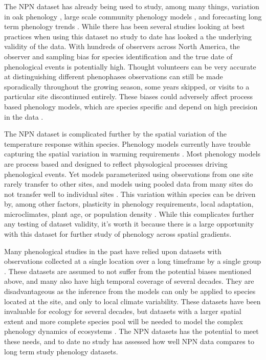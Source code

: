 \documentclass[fleqn,10pt,lineno]{wlpeerj} %
\begin{document}
The NPN dataset has already being used to study, among many things, variation in oak phenology \citep{gerst2017}, large scale community phenology models \citep{melaas2016}, and forecasting long term phenology trends \citep{jeong2013}. While there has been several studies looking at best practices when using this dataset \citep{crimmins2017, gerst2016} no study to date has looked a the underlying validity of the data. With hundreds of observers across North America, the observer and sampling bias for species identification and the true date of phenological events is potentially high. Thought volunteers can be very accurate at distinguishing different phenophases \citep{fuccillo2015} observations can still be made sporadically throughout the growing season, some years skipped, or visits to a particular site discontinued entirely. These biases could adversely affect process based phenology models, which are species specific and depend on high precision in the data \citep{chuine2000}.

The NPN dataset is complicated further by the spatial variation of the temperature response within species. Phenology models currently have trouble capturing the spatial variation in warming requirements \citep{garcia-mozo2008, xu2013, olsson2014, basler2016}. Most phenology models are process based and designed to reflect physological processes driving phenological events. Yet models parameterized using observations from one site rarely  transfer to other sites, and models using pooled data from many sites do not transfer well to individual sites \citep{garcia-mozo2008, basler2016}. This variation within species can be driven by, among other factors, plasticity in phenology requirements, local adaptation, microclimates, plant age, or population density \citep{kramer1995,diez2012}. While this complicates further any testing of dataset validity, it's worth it because there is a large opportunity with this dataset for further study of phenology across spatial gradients. 

Many phenological studies in the past have relied upon datasets with observations collected at a single location over a long timeframe by a single group \citep{cook2012, roberts2015, clark2014}. These datasets are assumed to not suffer from the potential biases mentioned above, and many also have high temporal coverage of several decades. They are disadvantageous as the inference from the models can only be applied to species located at the site, and only to local climate variability. These datasets have been invaluable for ecology for several decades, but datasets with a larger spatial extent and more complete species pool will be needed to model the complex phenology dynamics of ecosystems \citep{richardson2012, diez2012, caradonna2014}. The NPN datasets has the potential to meet these needs, and to date no study has assessed how well NPN data compares to long term study phenology datasets. 
\end{document}
